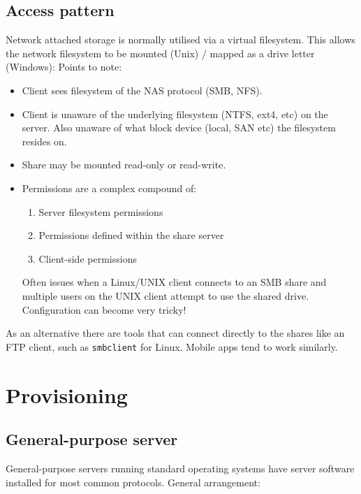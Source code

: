 \subsection{Access pattern}
\label{sec:access-pattern}

Network attached storage is normally utilised via a virtual filesystem.
This allows the network filesystem to be mounted (Unix) / mapped as a
drive letter (Windows): Points to note:

\begin{itemize}
\item
  Client sees filesystem of the NAS protocol (SMB, NFS).
\item
  Client is unaware of the underlying filesystem (NTFS, ext4, etc) on
  the server. Also unaware of what block device (local, SAN etc) the
  filesystem resides on.
\item
  Share may be mounted read-only or read-write.
\item
  Permissions are a complex compound of:

  \begin{enumerate}
  \item
    Server filesystem permissions
  \item
    Permissions defined within the share server
  \item
    Client-side permissions
  \end{enumerate}

  Often issues when a Linux/UNIX client connects to an SMB share and
  multiple users on the UNIX client attempt to use the shared drive.
  Configuration can become very tricky!
\end{itemize}

As an alternative there are tools that can connect directly to the
shares like an FTP client, such as \texttt{smbclient} for Linux. Mobile
apps tend to work similarly.

\section{Provisioning}
\label{sec:provisioning}

\subsection{General-purpose server}
\label{sec:general-purpose-server}

General-purpose servers running standard operating systems have server
software installed for most common protocols. General arrangement:

